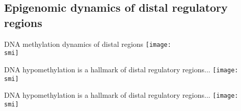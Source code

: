 \documentclass[10pt, usenames, dvipsnames]{beamer}
\def\smi{out/ln/updir/mw-gcthesis-oral/library.bib}
\begin{document}
\subsection{Epigenomic dynamics of distal regulatory regions}
\begin{frame}{DNA methylation dynamics of distal regions}
  \def\smi{out/ln/updir/mw-gcthesis-oral/ink/hypometh-clusters/clusters.pdf}
  \texttt{[image: \\smi]}%
\end{frame}
\begin{frame}{DNA hypomethylation is a hallmark of distal regulatory regions...}
  \def\smi{out/ln/updir/mw-gcthesis-oral/ink/hypometh-clusters/histone-marks.pdf}
  \texttt{[image: \\smi]}%
\end{frame}
\begin{frame}{DNA hypomethylation is a hallmark of distal regulatory regions...}
  \def\smi{out/ln/updir/mw-gcthesis-oral/ink/hypometh-clusters/rna-go.pdf}
  \texttt{[image: \\smi]}
\end{frame}
\end{document}
